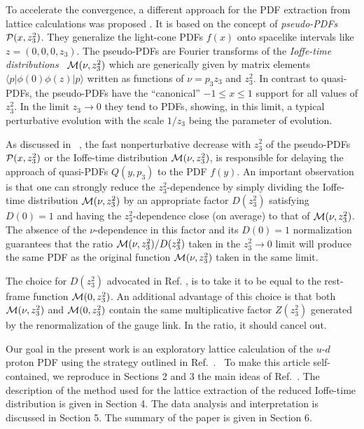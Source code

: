 To accelerate the convergence,   a different  approach for the
PDF extraction from lattice  calculations
 was  proposed  \cite{Radyushkin:2017cyf}. It is  based on the concept of
{\it pseudo-PDFs} $ {\cal P} (x, z_3^2) $.  They  generalize
the light-cone PDFs $f(x)$ onto spacelike intervals like
 $z=(0,0,0,z_3)$.   The pseudo-PDFs are Fourier transforms
 of the  \mbox{{\it Ioffe-time}  \cite{Ioffe:1969kf}}  \mbox{{\it distributions} \cite{Braun:1994jq}}
${\cal M} (\nu, z_3^2)$
 which are generically given by matrix elements  $  \langle p |   \phi(0) \phi (z)|p \rangle $
 written as  functions of $\nu = p_3 z_3$ and $z_3^2$.
In contrast to quasi-PDFs, the pseudo-PDFs have  the ``canonical''  $-1 \leq x  \leq 1$ support
 for all values of $z_3^2$.  In the limit  $z_3\to 0$ they tend to PDFs,
  showing, in this  limit, a typical perturbative evolution
 with the scale $1/z_3$ being the parameter of evolution.


{As discussed in~ \cite{Radyushkin:2016hsy,Radyushkin:2017gjd},  the  fast  nonperturbative
decrease  with $z_3^2$ of   the pseudo-PDFs  $ {\cal P} (x, z_3^2) $  or the
Ioffe-time distribution  ${\cal M} (\nu, z_3^2)$,  is responsible for   delaying the approach of quasi-PDFs  $Q(y, p_3)$
to the  PDF  $f(y)$}.
 An important observation is that one can  strongly
 reduce the   $z_3^2$-dependence
by simply dividing  the Ioffe-time distribution
${\cal M} (\nu, z_3^2)$ by an appropriate  factor $D(z_3^2)$ satisfying $D(0)=1$
and having the $z_3^2$-dependence close (on average) to that of
${\cal M} (\nu, z_3^2)$.
The absence of  the \mbox{$\nu$-dependence}  in this factor and its $D(0)=1$
normalization guarantees that   the ratio ${\cal M} (\nu, z_3^2)/D(z_3^2)$
taken in the $z_3^2 \to 0$ limit  will produce the same PDF as the original function
${\cal M} (\nu, z_3^2)$ taken in the same limit.


The choice for  $D(z_3^2)$ advocated in Ref.   \cite{Radyushkin:2017cyf},
is   to take it to  be equal to  the rest-frame function $ {\cal M} (0, z_3^2)$.
An  additional advantage of this choice  is that
both ${\cal M} (\nu, z_3^2)$ and ${\cal M} (0, z_3^2)$ contain the same multiplicative
factor $Z(z_3^2)$ generated by the  renormalization of the gauge link.
In the ratio, it should cancel out.

Our  goal in the present work  is an exploratory   lattice calculation
of the $u$-$d$ proton PDF using the strategy outlined in \mbox{Ref.   \cite{Radyushkin:2017cyf}. }
 To make this article  self-contained, we reproduce in Sections 2 and 3  the main ideas
 of \mbox{Ref.   \cite{Radyushkin:2017cyf}.}   The description of the method   used for the  lattice extraction of the
 reduced Ioffe-time distribution is given in Section 4.
 The data analysis   and interpretation is discussed  in Section 5.
 The summary of the paper is given in Section 6.
